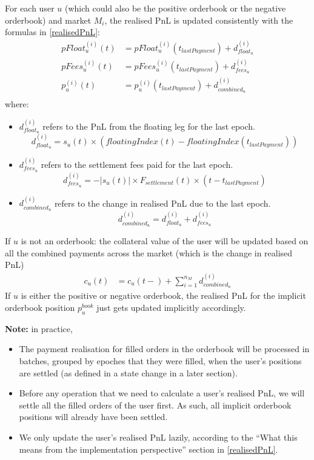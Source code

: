 \documentclass{article}%
\begin{document}
For each user $u$ (which could also be the positive orderbook or the negative orderbook) and market $M_i$, the realised PnL is updated consistently with the formulas in \ref{realisedPnL}:
    \begin{align*}
        pFloat_u^{(i)}(t) &= pFloat_u^{(i)}(t_{lastPayment}) + d_{float_u}^{(i)} \\
        pFees_u^{(i)}(t) &= pFees_u^{(i)}(t_{lastPayment}) + d_{fees_u}^{(i)} \\
        p_u^{(i)}(t) &= p_u^{(i)}(t_{lastPayment}) + d_{combined_u}^{(i)} \\
    \end{align*}
where:
\begin{itemize}
    \item $d_{float_u}^{(i)}$ refers to the PnL from the floating leg for the last epoch.
        $$d_{float_u}^{(i)} = s_u(t) \times \left( floatingIndex(t) - floatingIndex(t_{lastPayment}) \right)$$
    \item $d_{fees_u}^{(i)}$ refers to the settlement fees paid for the last epoch.
        $$d_{fees_u}^{(i)} = -|s_u(t)| \times F_{settlement}(t) \times (t - t_{lastPayment})$$
    \item $d_{combined_u}^{(i)}$ refers to the change in realised PnL due to the last epoch.
        $$d_{combined_u}^{(i)} = d_{float_u}^{(i)} + d_{fees_u}^{(i)}$$
\end{itemize}

If $u$ is not an orderbook: the collateral value of the user will be updated based on all the combined payments across the market (which is the change in realised PnL)
    \begin{align*}
        c_u(t) &= c_u(t-) + \sum_{i=1}^{n_M} d_{combined_u}^{(i)}
    \end{align*}
If $u$ is either the positive or negative orderbook, the realised PnL for the implicit orderbook position $p_u^{book}$ just gets updated implicitly accordingly.

\textbf{Note:} in practice,
\begin{itemize}
    \item The payment realisation for filled orders in the orderbook will be processed in batches, grouped by epoches that they were filled, when the user's positions are settled (as defined in a state change in a later section).
    \item Before any operation that we need to calculate a user's realised PnL, we will settle all the filled orders of the user first. As such, all implicit orderbook positions will already have been settled.
    \item We only update the user's realised PnL lazily, according to the ``What this means from the implementation perspective'' section in \ref{realisedPnL}.
\end{itemize}
\end{document}
